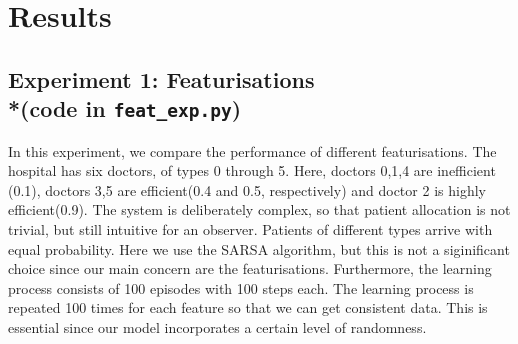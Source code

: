 \documentclass[11point]{article}
\begin{document}
%
%



\section{Results}

\subsection{Experiment 1: Featurisations \\*(code in \texttt{feat\_exp.py})}

In this experiment, we compare the performance of different featurisations. The hospital has six doctors, of types 0 through 5. Here, doctors 0,1,4 are inefficient (0.1), doctors 3,5 are efficient(0.4 and 0.5, respectively) and  doctor 2 is highly efficient(0.9). The system is deliberately complex, so that patient allocation is not trivial, but still intuitive for an observer. Patients of different types arrive with equal probability. Here we use the SARSA algorithm, but this is not a siginificant choice since our main concern are the featurisations. Furthermore, the learning process consists of 100 episodes with 100 steps each. The learning process is repeated 100 times for each feature so that we can get consistent data. This is essential since our model incorporates a certain level of randomness.
\end{document}
